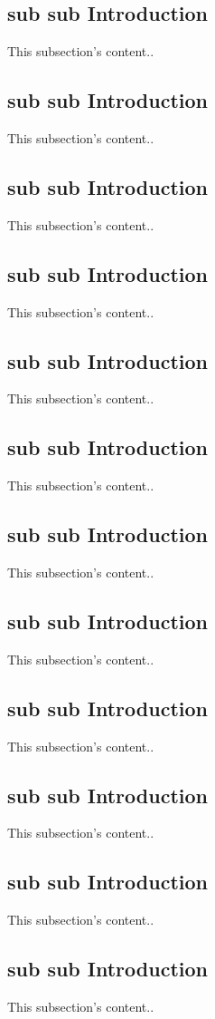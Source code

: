 \documentclass[12pt,a4paper,english]{book}
\begin{document}
\subsection{sub sub Introduction}
This subsection's content..
\subsection{sub sub Introduction}
This subsection's content..
\subsection{sub sub Introduction}
This subsection's content..
\subsection{sub sub Introduction}
This subsection's content..
\subsection{sub sub Introduction}
This subsection's content..
\subsection{sub sub Introduction}
This subsection's content..
\subsection{sub sub Introduction}
This subsection's content..
\subsection{sub sub Introduction}
This subsection's content..
\subsection{sub sub Introduction}
This subsection's content..
\subsection{sub sub Introduction}
This subsection's content..
\subsection{sub sub Introduction}
This subsection's content..
\subsection{sub sub Introduction}
This subsection's content..
\end{document}
